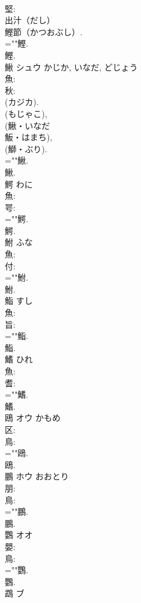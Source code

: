 \documentclass[8pt]{extreport}
\begin{document}
\begin{CJK}{UTF8}{min}
\\	堅: 
\\	出汁（だし） 
\\	鰹節（かつおぶし）.	
\\	=""鰹.
\\	鰹.
\\	鰍	シュウ	かじか, いなだ, どじょう		
\\	魚: 
\\	秋: 
\\	(カジカ). 
\\	(もじゃこ), 
\\	(鰍・いなだ 
\\	魬・はまち), 
\\	(鰤・ぶり). 
\\	=""鰍.
\\	鰍.
\\	鰐		わに				
\\	魚: 
\\	咢: 
\\	=""鰐.
\\	鰐.
\\	鮒		ふな				
\\	魚: 
\\	付: 
\\	=""鮒.
\\	鮒.
\\	鮨		すし				
\\	魚: 
\\	旨: 
\\	=""鮨.
\\	鮨.
\\	鰭		ひれ				
\\	魚: 
\\	耆: 
\\	=""鰭.
\\	鰭.
\\	鴎	オウ	かもめ		
\\	区: 
\\	鳥: 
\\	=""鴎.
\\	鴎.
\\	鵬	ホウ	おおとり		
\\	朋: 
\\	鳥: 
\\	=""鵬.
\\	鵬.
\\	鸚	オオ			
\\	嬰: 
\\	鳥: 
\\	=""鸚.
\\	鸚.
\\	鵡	ブ			

\end{CJK}
\end{document}
